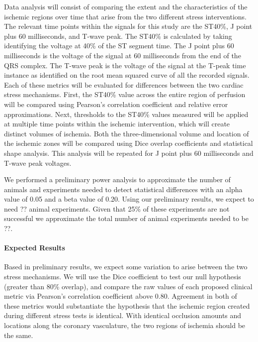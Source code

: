 Data analysis will consist of comparing the extent and the characteristics of the ischemic regions over time that arise from the two different stress interventions. The relevant time points within the signals for this study are the ST40\%, J point plus 60 milliseconds, and T-wave peak. The ST40\% is calculated by taking identifying the voltage at 40\% of the ST segment time. The J point plus 60 milliseconds is the voltage of the signal at 60 milliseconds from the end of the QRS complex. The T-wave peak is the voltage of the signal at the T-peak time instance as identified on the root mean squared curve of all the recorded signals. Each of these metrics will be evaluated for differences between the two cardiac stress mechanisms. First, the ST40\% value across the entire region of perfusion will be compared using Pearson's correlation coefficient and relative error approximations. Next, thresholds to the ST40\% values measured will be applied at multiple time points within the ischemic intervention, which will create distinct volumes of ischemia. Both the three-dimensional volume and location of the ischemic zones will be compared using Dice overlap coefficients and statistical shape analysis. This analysis will be repeated for J point plus 60 milliseconds and T-wave peak voltages. 

We performed a preliminary power analysis to approximate the number of animals and experiments needed to detect statistical differences with an alpha value of 0.05 and a beta value of 0.20. Using our preliminary results, we expect to need ?? animal experiments. Given that 25\% of these experiments are not successful we approximate the total number of animal experiments needed to be ??. 

\paragraph{Expected Results} Based in preliminary results, we expect some
variation to arise between the two stress mechanisms.  We will use the Dice
coefficient to test our null hypothesis (greater than 80\% overlap), and
compare the raw values of each proposed clinical metric via Pearson's correlation
coefficient above 0.80. Agreement in both of these metrics would
substantiate the hypothesis that the ischemic region created during
different stress tests is identical. With identical occlusion amounts and
locations along the coronary vasculature, the two regions of ischemia
should be the same. 

